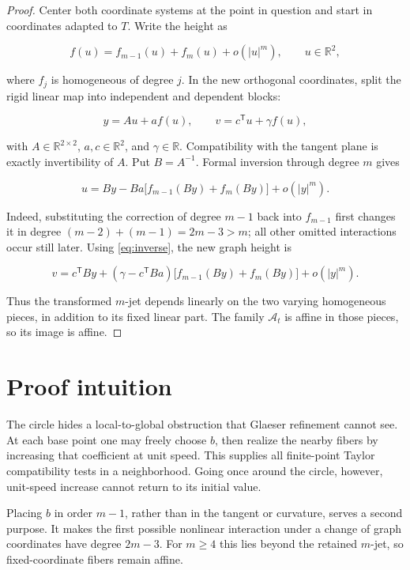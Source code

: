 \documentclass[11pt]{article}
\newcommand{\R}{\mathbb R}
\newcommand{\cA}{\mathcal A}
\begin{document}
\begin{proof}
Center both coordinate systems at the point in question and start in
coordinates adapted to \(T\). Write the height as

\[
 f(u)=f_{m-1}(u)+f_m(u)+o(|u|^m),\qquad u\in\R^2,
\]

where \(f_j\) is homogeneous of degree \(j\). In the new orthogonal
coordinates, split the rigid linear map into independent and dependent
blocks:

\[
 y=Au+a f(u),\qquad v=c^{\mathsf T}u+\gamma f(u),
\]

with \(A\in\R^{2\times2}\), \(a,c\in\R^2\), and \(\gamma\in\R\).
Compatibility with the tangent plane is exactly invertibility of \(A\).
Put \(B=A^{-1}\). Formal inversion through degree \(m\) gives

\begin{equation}\label{eq:inverse}
 u=By-Ba\bigl[f_{m-1}(By)+f_m(By)\bigr]+o(|y|^m).
\end{equation}

Indeed, substituting the correction of degree \(m-1\) back into
\(f_{m-1}\) first changes it in degree
\((m-2)+(m-1)=2m-3>m\); all other omitted interactions occur still later.
Using \eqref{eq:inverse}, the new graph height is

\begin{equation}\label{eq:transform}
 v=c^{\mathsf T}By+
   (\gamma-c^{\mathsf T}Ba)
   \bigl[f_{m-1}(By)+f_m(By)\bigr]+o(|y|^m).
\end{equation}

Thus the transformed \(m\)-jet depends linearly on the two varying
homogeneous pieces, in addition to its fixed linear part. The family
\(\cA_t\) is affine in those pieces, so its image is affine.
\end{proof}

\section{Proof intuition}

The circle hides a local-to-global obstruction that Glaeser refinement
cannot see. At each base point one may freely choose \(b\), then realize the
nearby fibers by increasing that coefficient at unit speed. This supplies
all finite-point Taylor compatibility tests in a neighborhood. Going once
around the circle, however, unit-speed increase cannot return to its initial
value.

Placing \(b\) in order \(m-1\), rather than in the tangent or curvature,
serves a second purpose. It makes the first possible nonlinear interaction
under a change of graph coordinates have degree \(2m-3\). For \(m\ge4\)
this lies beyond the retained \(m\)-jet, so fixed-coordinate fibers remain
affine.
\end{document}
